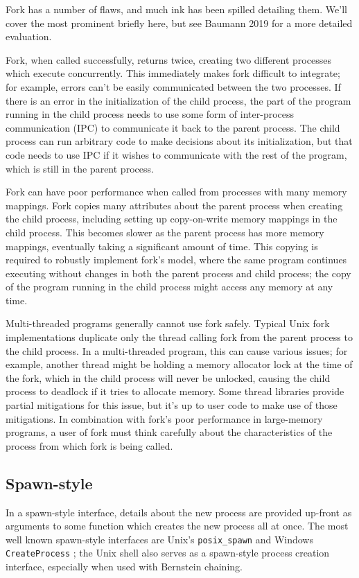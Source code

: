 \documentclass[letterpaper,twocolumn,10pt]{article}
\begin{document}
Fork has a number of flaws,
and much ink has been spilled detailing them.
We'll cover the most prominent briefly here,
but see Baumann 2019 \cite{forkroad} for a more detailed evaluation.

Fork, when called successfully, returns twice,
creating two different processes which execute concurrently.
This immediately makes fork difficult to integrate;
for example, errors can't be easily communicated between the two processes.
If there is an error in the initialization of the child process,
the part of the program running in the child process
needs to use some form of inter-process communication (IPC) to communicate it back to the parent process.
The child process can run arbitrary code to make decisions about its initialization,
but that code needs to use IPC if it wishes to communicate with the rest of the program,
which is still in the parent process.

Fork can have poor performance when called from processes with many memory mappings.\cite{forkroad}
Fork copies many attributes about the parent process when creating the child process,
including setting up copy-on-write memory mappings in the child process.
This becomes slower as the parent process has more memory mappings,
eventually taking a significant amount of time.
This copying is required to robustly implement fork's model,
where the same program continues executing without changes in both the parent process and child process;
the copy of the program running in the child process might access any memory at any time.

Multi-threaded programs generally cannot use fork safely.
Typical Unix fork implementations duplicate only the thread calling fork from the parent process to the child process.
In a multi-threaded program, this can cause various issues;
for example, another thread might be holding a memory allocator lock at the time of the fork,
which in the child process will never be unlocked,
causing the child process to deadlock if it tries to allocate memory.
Some thread libraries provide partial mitigations for this issue,
but it's up to user code to make use of those mitigations.\cite{pthread_atfork}
In combination with fork's poor performance in large-memory programs,
a user of fork must think carefully
about the characteristics of the process from which fork is being called.
\subsection{Spawn-style}
In a spawn-style interface,
details about the new process are provided up-front as arguments to some function
which creates the new process all at once.
The most well known spawn-style interfaces are Unix's \texttt{posix\_spawn} \cite{posix_spawn}
and Windows \texttt{CreateProcess} \cite{create_process};
the Unix shell also serves as a spawn-style process creation interface,
especially when used with Bernstein chaining\cite{chainloading}.
\end{document}
